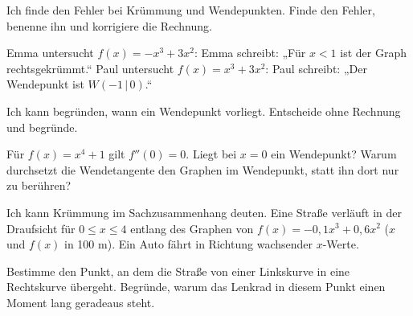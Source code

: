 \begin{aufgabe}{Ich finde den Fehler bei Krümmung und Wendepunkten.}
Finde den Fehler, benenne ihn und korrigiere die Rechnung.
\begin{teile}
\teil Emma untersucht $f(x) = -x^3 + 3x^2$:
Emma schreibt: „Für $x < 1$ ist der Graph rechtsgekrümmt.“
\teil Paul untersucht $f(x) = x^3 + 3x^2$:
Paul schreibt: „Der Wendepunkt ist $W(-1\,|\,0)$.“
\end{teile}
\end{aufgabe}

\begin{aufgabe}{Ich kann begründen, wann ein Wendepunkt vorliegt.}
Entscheide ohne Rechnung und begründe.
\begin{teile}
\teil Für $f(x) = x^4 + 1$ gilt $f''(0) = 0$. Liegt bei $x = 0$ ein Wendepunkt?
\teil Warum durchsetzt die Wendetangente den Graphen im Wendepunkt, statt ihn dort nur zu berühren?
\end{teile}
\end{aufgabe}

\begin{aufgabe}{Ich kann Krümmung im Sachzusammenhang deuten.}
Eine Straße verläuft in der Draufsicht für $0 \le x \le 4$ entlang des Graphen von $f(x) = -0{,}1x^3 + 0{,}6x^2$ ($x$ und $f(x)$ in 100 m). Ein Auto fährt in Richtung wachsender $x$-Werte.
\begin{teile}
\teil Bestimme den Punkt, an dem die Straße von einer Linkskurve in eine Rechtskurve übergeht.
\teil Begründe, warum das Lenkrad in diesem Punkt einen Moment lang geradeaus steht.
\end{teile}
\end{aufgabe}
